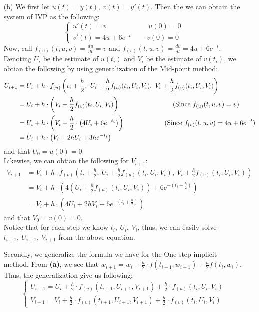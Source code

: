 \documentclass[11pt]{article}
\begin{document}
\begin{itemize}
	\item [(b)]
	We first let $ u(t) = y(t),\ v(t) = y'(t) $. Then the we can obtain the system of IVP as the following:
	\[ \begin{cases}
	u'(t) = v \qquad\qquad\qquad u(0) = 0\\
	v'(t) = 4u + 6e^{-t} \qquad\ v(0) = 0
	\end{cases} \]
	Now, call $ f_{(u)}(t,u,v) = \frac{du}{dt} = v$ and $ f_{(v)}(t,u,v) = \frac{dv}{dt} = 4u + 6e^{-t} $. Denoting $ U_i $ be the estimate of $ u(t_i) $ and $ V_i $ be the estimate of $ v(t_i) $, we obtian the following by using generalization of the Mid-point method:
	\begin{align*}
	U_{i+1} &= U_i + h\cdot f_{(u)}\left(t_i + \frac{h}{2},\ U_i +\frac{h}{2}f_{(u)}(t_i,U_i,V_i),\ V_i + \frac{h}{2}f_{(v)}(t_i,U_i,V_i)\right)\\
	&=U_i + h\cdot \left(V_i + \frac{h}{2}f_{(v)}(t_i,U_i,V_i) \right) \qquad\qquad\qquad\qquad \text{(Since $ f_{(u)}(t,u,v) = v $)}\\
	&=U_i + h\cdot \left(V_i + \frac{h}{2}\cdot \left(4U_i + 6e^{-t_i}\right)\right)\qquad\qquad\qquad \text{(Since $ f_{(v)}(t,u,v) = 4u + 6e^{-t} $)}\\
	&=U_i + h\cdot \left(V_i + 2hU_i + 3he^{-t_i}\right)
	\end{align*} and that $ U_0 = u(0) = 0 $.\\
	Likewise, we can obtian the following for $ V_{i+1} $:
	\begin{align*}
	V_{i+1} &= V_i + h\cdot f_{(v)}\left(t_i + \frac{h}{2},\ U_i +\frac{h}{2}f_{(u)}(t_i,U_i,V_i),\ V_i + \frac{h}{2}f_{(v)}(t_i,U_i,V_i)\right)\\
	&=V_i + h\cdot \left(4\left(U_i +\frac{h}{2}f_{(u)}(t_i,U_i,V_i)\right) + 6e^{-\left(t_i + \frac{h}{2}\right)}\right)\\
	&=V_i + h\cdot \left(4U_i + 2hV_i + 6e^{-\left(t_i + \frac{h}{2}\right)} \right)
	\end{align*} and that $ V_0 = v(0) = 0 $.\\
	
	Notice that for each step we know $ t_i,\ U_i,\ V_i $, thus, we can easily solve $ t_{i+1},\ U_{i+1},\ V_{i+1} $ from the above equation.
	
	Secondly, we generalize the formula we have for the One-step implicit method. From \textbf{(a)}, we see that $ w_{i+1} = w_i + \frac{h}{2}\cdot f(t_{i+1},w_{i+1}) + \frac{h}{2}f(t_{i},w_i) $. Thus, the generalization give us following:
	\[\begin{cases}
	U_{i+1} = U_i + \frac{h}{2}\cdot f_{(u)}(t_{i+1},U_{i+1},V_{i+1}) + \frac{h}{2} \cdot f_{(u)}(t_i,U_i,V_i)\\
	V_{i+1} = V_i + \frac{h}{2}\cdot f_{(v)}(t_{i+1},U_{i+1},V_{i+1}) + \frac{h}{2} \cdot f_{(v)}(t_i,U_i,V_i)
	\end{cases}\]
	

\end{itemize}
\end{document}

